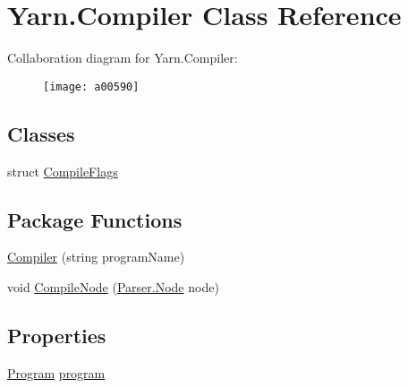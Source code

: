 \hypertarget{a00048}{\section{Yarn.\-Compiler Class Reference}
\label{a00048}
}


Collaboration diagram for Yarn.\-Compiler\-:
\nopagebreak
\begin{figure}[H]
\begin{center}
\leavevmode
\texttt{[image: a00590]}
\end{center}
\end{figure}
\subsection*{Classes}
\begin{DoxyCompactItemize}
\item 
struct \hyperlink{a00048_a00363}{Compile\-Flags}
\end{DoxyCompactItemize}
\subsection*{Package Functions}
\begin{DoxyCompactItemize}
\item 
\hyperlink{a00048_a47bfde319a618a1e11d00cb282a84364}{Compiler} (string program\-Name)
\item 
void \hyperlink{a00048_a10b52c5694f78285d087a455e3654eaa}{Compile\-Node} (\hyperlink{a00132}{Parser.\-Node} node)
\end{DoxyCompactItemize}
\subsection*{Properties}
\begin{DoxyCompactItemize}
\item 
\hyperlink{a00146}{Program} \hyperlink{a00048_aa1737da428ec7d597009661dd8a47829}{program}
\end{DoxyCompactItemize}
